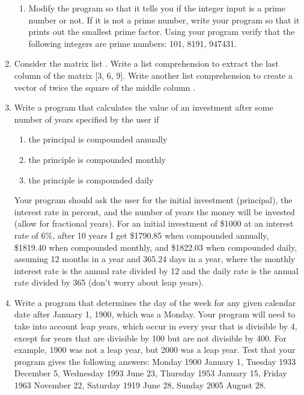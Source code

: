 \documentclass[letterpaper,10pt,english]{sphinxmanual}
\begin{document}
\begin{enumerate}
\begin{enumerate}
\item {} 
\sphinxAtStartPar
Modify the program so that it tells you if the integer input is a prime number or not.  If it is not a prime number, write your program so that it prints out the smallest prime factor.  Using your program verify that the following integers are prime numbers: 101, 8191, 947431.

\end{enumerate}

\item {} 
\sphinxAtStartPar
Consider the matrix list .  Write a list comprehension to extract the last column of the matrix {[}3, 6, 9{]}.  Write another list comprehension to create a vector of twice the square of the middle column \sphinxcode{\sphinxupquote{{[}8, 50, 128{]}}}.

\item {} 
\sphinxAtStartPar
Write a program that calculates the value of an investment after some number of years specified by the user if
\begin{enumerate}
%
\item {} 
\sphinxAtStartPar
the principal is compounded annually

\item {} 
\sphinxAtStartPar
the principle is compounded monthly

\item {} 
\sphinxAtStartPar
the principle is compounded daily

\end{enumerate}

\sphinxAtStartPar
Your program should ask the user for the initial investment (principal), the interest rate in percent, and the number of years the money will be invested (allow for fractional years).  For an initial investment of \$1000 at an interest rate of 6\%, after 10 years I get \$1790.85 when compounded annually, \$1819.40 when compounded monthly, and \$1822.03 when compounded daily, assuming 12 months in a year and 365.24 days in a year, where the monthly interest rate is the annual rate divided by 12 and the daily rate is the annual rate divided by 365 (don’t worry about leap years).

\item {} 
\sphinxAtStartPar
Write a program that determines the day of the week for any given calendar date after January 1, 1900, which was a Monday.  Your program will need to take into account leap years, which occur in every year that is divisible by 4, except for years that are divisible by 100 but are not divisible by 400.  For example, 1900 was not a leap year, but 2000 was a leap year.  Test that your program gives the following answers: Monday 1900 January 1, Tuesday 1933 December 5, Wednesday 1993 June 23, Thursday 1953 January 15, Friday 1963 November 22, Saturday 1919 June 28, Sunday 2005 August 28.

\end{enumerate}
\end{document}
